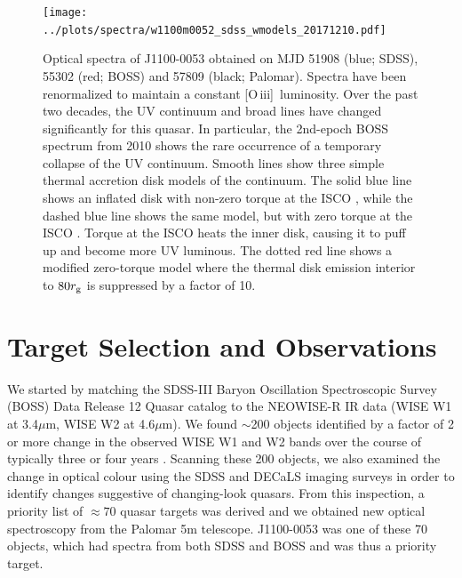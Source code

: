 \documentclass{nature}
\newcommand{\oiii}{[O\,{\sc iii}]\ }
\begin{document}
\begin{figure}
  \centering
  \texttt{[image: ../plots/spectra/w1100m0052\_sdss\_wmodels\_20171210.pdf]}
  \caption[]{Optical spectra of J1100-0053 obtained on MJD 51908 (blue; SDSS), 55302 (red; BOSS) and 57809 (black; Palomar).  Spectra have been renormalized to maintain a constant \oiii luminosity. Over the past two decades, the UV continuum and broad lines have changed significantly for this quasar.  In particular, the 2nd-epoch BOSS spectrum from 2010 shows the rare occurrence of a temporary collapse of the UV continuum.  Smooth lines show three simple thermal accretion disk models of the continuum.  The solid blue line shows an inflated disk with non-zero torque at the ISCO \cite[e.g.,][]{Sirko_Goodman2003}, while the dashed blue line shows the same model, but with zero torque at the ISCO \cite[i.e., a simple $\alpha$-disk model,][]{SS73}.  Torque at the ISCO heats the inner disk, causing it to puff up and become more UV luminous.  The dotted red line shows a modified zero-torque model where the thermal disk emission interior to $80 r_{\rm g}$ is suppressed by a factor of 10. }
  \label{fig:J110057_spectra}
\end{figure}
\section{Target Selection and Observations}  
We started by matching the SDSS-III Baryon Oscillation Spectroscopic Survey (BOSS) Data Release 12 Quasar catalog \cite[DR12Q; ][]{Paris2017} to the NEOWISE-R IR data (WISE W1 at 3.4$\mu$m, WISE W2 at 4.6$\mu$m). We found $\sim$200 objects identified by a factor of 2 or more change in the observed WISE W1 and W2 bands over the course of typically three or four years \citep[see][and the Supplemental Material for the detailed NEOWISE-R selection]{Meisner2017b}. Scanning these 200 objects, we also examined the change in optical colour using the SDSS and DECaLS imaging surveys in order to identify changes suggestive of changing-look quasars.  From this inspection, a priority list of $\approx70$ quasar targets was derived and we obtained new optical spectroscopy from the Palomar 5m telescope.  J1100-0053 was one of these 70 objects, which had spectra from both SDSS and BOSS and was thus a priority target.
\end{document}
